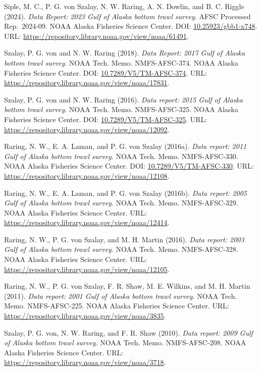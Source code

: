 \documentclass[
  letterpaper,
  oneside,
  open=any]{scrbook}
\begin{document}
Siple, M. C., P. G. von Szalay, N. W. Raring, A. N. Dowlin, and B. C.
Riggle (2024). \emph{Data Report: 2023 Gulf of Alaska bottom trawl
survey}. AFSC Processed Rep.~2024-09. NOAA Alaska Fisheries Science
Center. DOI:
\href{https://doi.org/10.25923\%2Fgbb1-x748}{10.25923/gbb1-x748}. URL:
\url{https://repository.library.noaa.gov/view/noaa/61491}.

Szalay, P. G. von and N. W. Raring (2018). \emph{Data Report: 2017 Gulf
of Alaska bottom trawl survey}. NOAA Tech. Memo. NMFS-AFSC-374. NOAA
Alaska Fisheries Science Center. DOI:
\href{https://doi.org/10.7289\%2FV5\%2FTM-AFSC-374}{10.7289/V5/TM-AFSC-374}.
URL: \url{https://repository.library.noaa.gov/view/noaa/17831}.

Szalay, P. G. von and N. W. Raring (2016). \emph{Data report: 2015 Gulf
of Alaska bottom trawl survey}. NOAA Tech. Memo. NMFS-AFSC-325. NOAA
Alaska Fisheries Science Center. DOI:
\href{https://doi.org/10.7289\%2FV5\%2FTM-AFSC-325}{10.7289/V5/TM-AFSC-325}.
URL: \url{https://repository.library.noaa.gov/view/noaa/12092}.

Raring, N. W., E. A. Laman, and P. G. von Szalay (2016a). \emph{Data
report: 2011 Gulf of Alaska bottom trawl survey}. NOAA Tech. Memo.
NMFS-AFSC-330. NOAA Alaska Fisheries Science Center. DOI:
\href{https://doi.org/10.7289\%2FV5\%2FTM-AFSC-330}{10.7289/V5/TM-AFSC-330}.
URL: \url{https://repository.library.noaa.gov/view/noaa/12108}.

Raring, N. W., E. A. Laman, and P. G. von Szalay (2016b). \emph{Data
report: 2005 Gulf of Alaska bottom trawl survey}. NOAA Tech. Memo.
NMFS-AFSC-329. NOAA Alaska Fisheries Science Center. URL:
\url{https://repository.library.noaa.gov/view/noaa/12414}.

Raring, N. W., P. G. von Szalay, and M. H. Martin (2016). \emph{Data
report: 2003 Gulf of Alaska bottom trawl survey}. NOAA Tech. Memo.
NMFS-AFSC-328. NOAA Alaska Fisheries Science Center. URL:
\url{https://repository.library.noaa.gov/view/noaa/12105}.

Raring, N. W., P. G. von Szalay, F. R. Shaw, M. E. Wilkins, and M. H.
Martin (2011). \emph{Data report: 2001 Gulf of Alaska bottom trawl
survey}. NOAA Tech. Memo. NMFS-AFSC-225. NOAA Alaska Fisheries Science
Center. URL: \url{https://repository.library.noaa.gov/view/noaa/3835}.

Szalay, P. G. von, N. W. Raring, and F. R. Shaw (2010). \emph{Data
report: 2009 Gulf of Alaska bottom trawl survey}. NOAA Tech. Memo.
NMFS-AFSC-208. NOAA Alaska Fisheries Science Center. URL:
\url{https://repository.library.noaa.gov/view/noaa/3718}.
\end{document}
